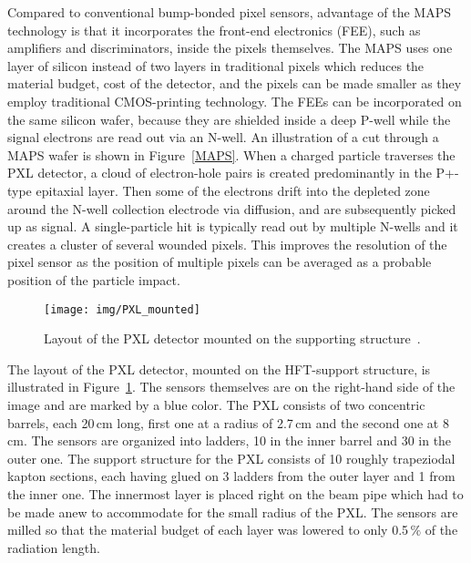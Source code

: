 Compared to conventional bump-bonded pixel sensors, advantage of the MAPS technology is that it incorporates the front-end electronics (FEE), such as amplifiers and discriminators, inside the pixels themselves. The MAPS uses one layer of silicon instead of two layers in traditional pixels which reduces the material budget, cost of the detector, and the pixels can be made smaller as they employ traditional CMOS-printing technology. The FEEs can be incorporated on the same silicon wafer, because they are shielded inside a deep P-well while the signal electrons are read out via an N-well. An illustration of a cut through a MAPS wafer is shown in Figure~\ref{MAPS}\@. When a charged particle traverses the PXL detector, a cloud of electron-hole pairs is created predominantly in the P+-type epitaxial layer. Then some of the electrons drift into the depleted zone around the N-well collection electrode via diffusion, and are subsequently picked up as signal. A single-particle hit is typically read out by multiple N-wells and it creates a cluster of several wounded pixels. This improves the resolution of the pixel sensor as the position of multiple pixels can be averaged as a probable position of the particle impact.

\begin{figure}[!htb]
\begin{center}
 \texttt{[image: img/PXL\_mounted]}\\
\end{center}
\caption[Layout of the PXL detector.]{\label{PXL}Layout of the PXL detector mounted on the supporting structure~\cite{HftTdr}.}
\end{figure}

The layout of the PXL detector, mounted on the HFT-support structure, is illustrated in Figure~\ref{PXL}\@. The sensors themselves are on the right-hand side of the image and are marked by a blue color. The PXL consists of two concentric barrels, each 20$\,$cm long, first one at a radius of 2.7$\,$cm and the second one at 8$\,$cm.  The sensors are organized into ladders, 10 in the inner barrel and 30 in the outer one. The support structure for the PXL consists of 10 roughly trapeziodal kapton sections, each having glued on 3 ladders from the outer layer and 1 from the inner one. The innermost layer is placed right on the beam pipe which had to be made anew to accommodate for the small radius of the PXL\@. The sensors are milled so that the material budget of each layer was lowered to only 0.5$\,\%$ of the radiation length.

